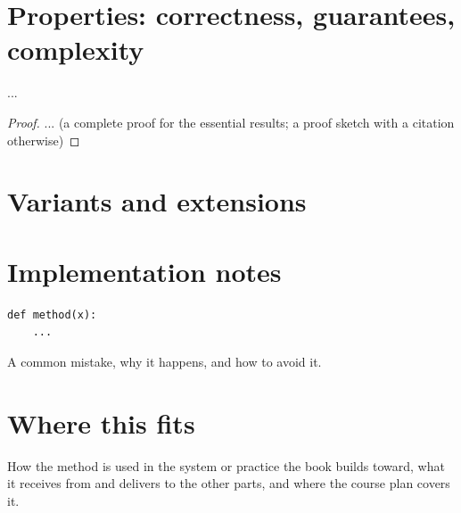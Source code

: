 \section{Properties: correctness, guarantees, complexity}
\label{sec:chNN-properties}
\begin{theorem}[Name]
\label{thm:chNN-name}
...
\end{theorem}
\begin{proof}
... (a complete proof for the essential results; a proof sketch with a citation otherwise)
\end{proof}

\section{Variants and extensions}
\label{sec:chNN-variants}

\section{Implementation notes}
\label{sec:chNN-implementation}
\begin{lstlisting}[caption={Core of the implementation (from \code{code/chNN\_slug.py}).},label={lst:chNN-core}]
def method(x):
    ...
\end{lstlisting}

\begin{pitfall}
A common mistake, why it happens, and how to avoid it.
\end{pitfall}

\section{Where this fits}
\label{sec:chNN-application}
\begin{applicationbox}
How the method is used in the system or practice the book builds toward, what it
receives from and delivers to the other parts, and where the course plan covers it.
\end{applicationbox}

